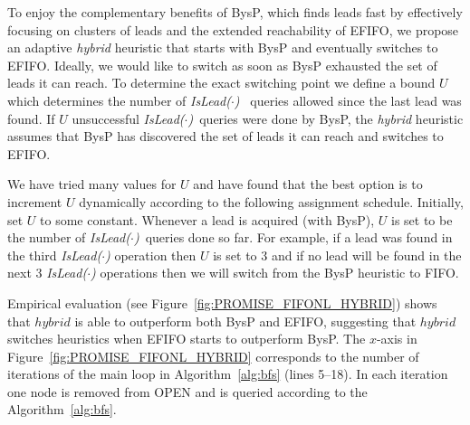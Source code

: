 \documentclass[journal]{IEEEtran}
\newcommand{\islead}[1]{{\em IsLead(#1)}}
\begin{document}
To enjoy the complementary benefits of BysP, which finds leads fast by effectively focusing on clusters of leads and the extended reachability of EFIFO, we propose an adaptive {\em hybrid} heuristic that starts with BysP and eventually switches to EFIFO. Ideally, we would like to switch as soon as BysP exhausted the set of leads it can reach. To determine the exact switching point we define a bound \(U\) which determines the number of \islead{$\cdot$}~ queries allowed since the last lead was found. If \(U\) unsuccessful \islead{$\cdot$}~queries were done by BysP, the \emph{hybrid} heuristic assumes that BysP has discovered the set of leads it can reach and switches to EFIFO.

We have tried many values for $U$ and have found that the best option is to increment $U$ dynamically according to the following assignment schedule. Initially, set $U$ to some constant. Whenever a lead is acquired (with BysP), $U$ is set to be the number of \islead{$\cdot$}~queries done so far. For example, if a lead was found in the third \islead{$\cdot$} operation then $U$ is set to 3 and if no lead will be found in the next 3 \islead{$\cdot$} operations then we will switch from the BysP heuristic to FIFO. 


Empirical evaluation (see Figure~\ref{fig:PROMISE_FIFONL_HYBRID}) shows that \(hybrid\) is able to outperform both BysP and EFIFO, suggesting that $hybrid$ switches heuristics when EFIFO starts to outperform BysP. 
The $x$-axis in Figure~\ref{fig:PROMISE_FIFONL_HYBRID} corresponds to the number of iterations of the main loop in Algorithm~\ref{alg:bfs} (lines 5--18). 
In each iteration one node is removed from OPEN and is queried according to the Algorithm~\ref{alg:bfs}.

\end{document}

